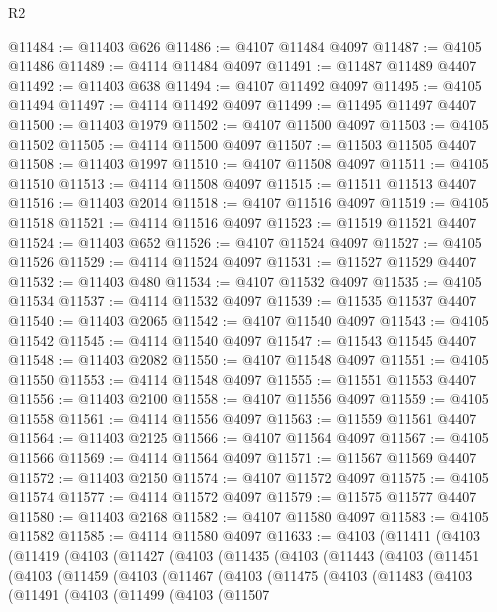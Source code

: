 \begin{lexlean}{R2}
\begin{coremodule}
@11484 := @11403 @626
@11486 := @4107 @11484 @4097
@11487 := @4105 @11486
@11489 := @4114 @11484 @4097
@11491 := @11487 @11489 @4407
@11492 := @11403 @638
@11494 := @4107 @11492 @4097
@11495 := @4105 @11494
@11497 := @4114 @11492 @4097
@11499 := @11495 @11497 @4407
@11500 := @11403 @1979
@11502 := @4107 @11500 @4097
@11503 := @4105 @11502
@11505 := @4114 @11500 @4097
@11507 := @11503 @11505 @4407
@11508 := @11403 @1997
@11510 := @4107 @11508 @4097
@11511 := @4105 @11510
@11513 := @4114 @11508 @4097
@11515 := @11511 @11513 @4407
@11516 := @11403 @2014
@11518 := @4107 @11516 @4097
@11519 := @4105 @11518
@11521 := @4114 @11516 @4097
@11523 := @11519 @11521 @4407
@11524 := @11403 @652
@11526 := @4107 @11524 @4097
@11527 := @4105 @11526
@11529 := @4114 @11524 @4097
@11531 := @11527 @11529 @4407
@11532 := @11403 @480
@11534 := @4107 @11532 @4097
@11535 := @4105 @11534
@11537 := @4114 @11532 @4097
@11539 := @11535 @11537 @4407
@11540 := @11403 @2065
@11542 := @4107 @11540 @4097
@11543 := @4105 @11542
@11545 := @4114 @11540 @4097
@11547 := @11543 @11545 @4407
@11548 := @11403 @2082
@11550 := @4107 @11548 @4097
@11551 := @4105 @11550
@11553 := @4114 @11548 @4097
@11555 := @11551 @11553 @4407
@11556 := @11403 @2100
@11558 := @4107 @11556 @4097
@11559 := @4105 @11558
@11561 := @4114 @11556 @4097
@11563 := @11559 @11561 @4407
@11564 := @11403 @2125
@11566 := @4107 @11564 @4097
@11567 := @4105 @11566
@11569 := @4114 @11564 @4097
@11571 := @11567 @11569 @4407
@11572 := @11403 @2150
@11574 := @4107 @11572 @4097
@11575 := @4105 @11574
@11577 := @4114 @11572 @4097
@11579 := @11575 @11577 @4407
@11580 := @11403 @2168
@11582 := @4107 @11580 @4097
@11583 := @4105 @11582
@11585 := @4114 @11580 @4097
@11633 := @4103
    (@11411
      (@4103
        (@11419
          (@4103
            (@11427
              (@4103
                (@11435
                  (@4103
                    (@11443
                      (@4103
                        (@11451
                          (@4103
                            (@11459
                              (@4103
                                (@11467
                                  (@4103
                                    (@11475
                                      (@4103
                                        (@11483
                                          (@4103
                                            (@11491
                                              (@4103
                                                (@11499
                                                  (@4103
                                                    (@11507

\end{coremodule}
\end{lexlean}
